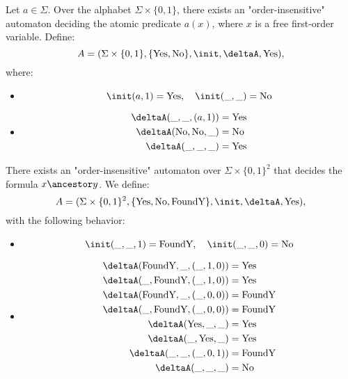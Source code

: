 \documentclass[a4paper,UKenglish,cleveref, autoref, thm-restate]{lipics-v2021}
\begin{document}
\begin{lemma}\label{lem:atomic-a}
	Let $a \in \Sigma$. Over the alphabet $\Sigma \times \{0,1\}$, there exists an "order-insensitive" automaton deciding
	the atomic predicate $a(x)$, where $x$ is a free first-order variable. Define:
	\[
		A = (\Sigma \times \{0,1\}, \{\text{Yes}, \text{No}\}, \init, \deltaA, \text{Yes}),
	\]
	where:
	\begin{itemize}
		\item
		      \[
			      \init(a,1) = \text{Yes}, \quad \init(\_,\_) = \text{No}
		      \]
		\item
		      \[
			      \begin{aligned}
				      \deltaA(\_, \_, (a,1))            & = \text{Yes} \\
				      \deltaA(\text{No}, \text{No}, \_) & = \text{No}  \\
				      \deltaA(\_, \_, \_)               & = \text{Yes}
			      \end{aligned}
		      \]
	\end{itemize}
\end{lemma}

\begin{lemma}\label{lem:atomic-ancestor}
	There exists an "order-insensitive" automaton over $\Sigma \times \{0,1\}^2$ that decides the formula $x \ancestor y$. We define:
	\[
		A = (\Sigma \times \{0,1\}^2, \{\text{Yes}, \text{No}, \text{FoundY}\}, \init, \deltaA, \text{Yes}),
	\]
	with the following behavior:
	\begin{itemize}
		\item
		      \[
			      \init(\_,\_,1) = \text{FoundY}, \quad \init(\_,\_,0) = \text{No}
		      \]
		\item
		      \[
			      \begin{aligned}
				      \deltaA(\text{FoundY}, \_, (\_,1,0)) & = \text{Yes}    \\
				      \deltaA(\_, \text{FoundY}, (\_,1,0)) & = \text{Yes}    \\
				      \deltaA(\text{FoundY}, \_, (\_,0,0)) & = \text{FoundY} \\
				      \deltaA(\_, \text{FoundY}, (\_,0,0)) & = \text{FoundY} \\
				      \deltaA(\text{Yes}, \_, \_)          & = \text{Yes}    \\
				      \deltaA(\_, \text{Yes}, \_)          & = \text{Yes}    \\
				      \deltaA(\_, \_, (\_,0,1))            & = \text{FoundY} \\
				      \deltaA(\_, \_, \_)                  & = \text{No}
			      \end{aligned}
		      \]
	\end{itemize}
\end{lemma}
\end{document}

